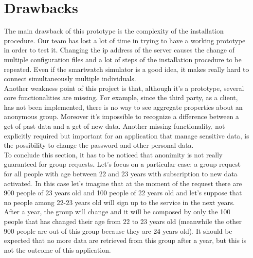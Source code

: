 \section{Drawbacks}
The main drawback of this prototype is the complexity of the installation procedure. Our team has lost a lot of time in trying to have a working prototype in order to test it. Changing the ip address of the server causes the change of multiple configuration files and a lot of steps of the installation procedure to be repeated. Even if the smartwatch simulator is a good idea, it makes really hard to connect simultaneously multiple individuals.\\
Another weakness point of this project is that, although it's a prototype, several core functionalities are missing. For example, since the third party, as a client, has not been implemented, there is no way to see aggregate properties about an anonymous group. Moreover it's impossible to recognize a difference between a get of past data and a get of new data. Another missing functionality, not explicitly required but important for an application that manage sensitive data, is the possibility to change the password and other personal data.\\
To conclude this section, it has to be noticed that anonimity is not really guaranteed for group requests. Let's focus on a particular case: a group request for all people with age between 22 and 23 years with subscription to new data activated. In this case let's imagine that at the moment of the request there are 900 people of 23 years old and 100 people of 22 years old and let's suppose that no people among 22-23 years old will sign up to the service in the next years. After a year, the group will change and it will be composed by only the 100 people that has changed their age from 22 to 23 years old (meanwhile the other 900 people are out of this group because they are 24 years old). It should be expected that no more data are retrieved from this group after a year, but this is not the outcome of this application.